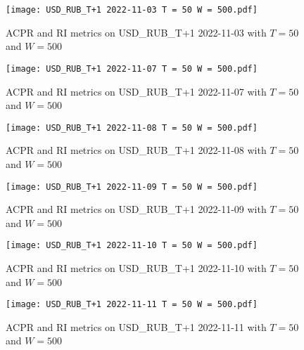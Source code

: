 \begin{figure}[htbp]
	\texttt{[image: USD\_RUB\_T+1 2022-11-03 T = 50 W = 500.pdf]}
	\caption{ACPR and RI metrics on USD\_RUB\_T+1 2022-11-03 with $T = 50$ and $W = 500$}
\end{figure}

\begin{figure}[htbp]
	\texttt{[image: USD\_RUB\_T+1 2022-11-07 T = 50 W = 500.pdf]}
	\caption{ACPR and RI metrics on USD\_RUB\_T+1 2022-11-07 with $T = 50$ and $W = 500$}
\end{figure}

\begin{figure}[htbp]
	\texttt{[image: USD\_RUB\_T+1 2022-11-08 T = 50 W = 500.pdf]}
	\caption{ACPR and RI metrics on USD\_RUB\_T+1 2022-11-08 with $T = 50$ and $W = 500$}
\end{figure}

\begin{figure}[htbp]
	\texttt{[image: USD\_RUB\_T+1 2022-11-09 T = 50 W = 500.pdf]}
	\caption{ACPR and RI metrics on USD\_RUB\_T+1 2022-11-09 with $T = 50$ and $W = 500$}
\end{figure}

\begin{figure}[htbp]
	\texttt{[image: USD\_RUB\_T+1 2022-11-10 T = 50 W = 500.pdf]}
	\caption{ACPR and RI metrics on USD\_RUB\_T+1 2022-11-10 with $T = 50$ and $W = 500$}
\end{figure}

\begin{figure}[htbp]
	\texttt{[image: USD\_RUB\_T+1 2022-11-11 T = 50 W = 500.pdf]}
	\caption{ACPR and RI metrics on USD\_RUB\_T+1 2022-11-11 with $T = 50$ and $W = 500$}
\end{figure}

